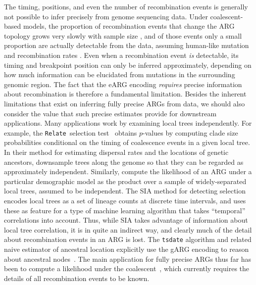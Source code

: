 \documentclass{article}
\newcommand{\relate}[0]{\texttt{Relate}}
\begin{document}
The timing, positions, and even the number of recombination events is generally
not possible to infer precisely from genome sequencing data. Under
coalescent-based models, the proportion of recombination events that change the
ARG topology grows very slowly with sample size \citep{hein2004gene}, and of those
events only a small proportion are actually detectable from the data, assuming
human-like mutation and recombination rates \citep{myers2002detection,hayman2023recoverability}.
Even when a recombination event \emph{is} detectable, its timing and breakpoint
position can only be inferred approximately, depending on how much information
can be elucidated from mutations in the surrounding genomic region.
The fact that the eARG encoding \emph{requires}
precise information about recombination is therefore a fundamental limitation.
Besides the inherent limitations that exist on inferring fully
precise ARGs from data,
we should also consider the value that such precise estimates provide
for downstream applications.
Many applications work by examining local trees independently.
For example, the \relate\ selection test~\citep{speidel2019method}
obtains $p$-values by computing clade size probabilities conditional
on the timing of coalescence events in a given local tree.
In their method
for estimating dispersal rates and the locations of genetic
ancestors,
\cite{osmond2021estimating} downsample trees along the genome
so that they can be regarded as approximately independent.
Similarly, \cite{fan2023likelihood} compute the likelihood
of an ARG under a particular demographic model as the product
over a sample of widely-separated local trees, assumed to be independent.
The SIA method for detecting selection~\citep{hejase2022deep}
encodes local trees as a set of lineage counts at discrete
time intervals, and uses these as feature for a
type of machine learning algorithm
that takes ``temporal'' correlations into account.
Thus, while SIA takes advantage of information about local tree correlation,
it is in quite an indirect way, and
clearly much of the detail about recombination events in an ARG is lost.
The \texttt{tsdate} algorithm and related naive estimator
of ancestral location explicitly use the gARG encoding
to reason about ancestral nodes~\citep{wohns2022unified}.
The main application for fully precise ARGs thus far has been
to compute a likelihood under the
coalescent~\citep[e.g.][]{kuhner2000maximum,mahmoudi2022bayesian,
guo2022recombination},
which currently requires the details of all recombination
events to be known.
\end{document}
